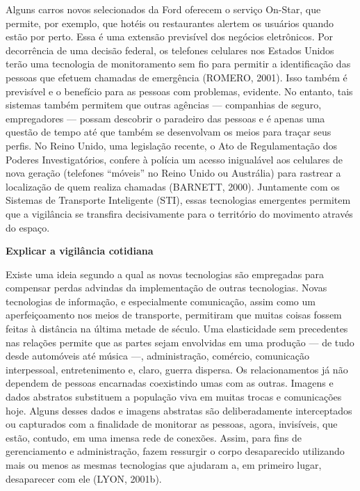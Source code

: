 Alguns carros novos selecionados da Ford oferecem o serviço On-Star, que
permite, por exemplo, que hotéis ou restaurantes alertem os usuários
quando estão por perto. Essa é uma extensão previsível dos negócios
eletrônicos. Por decorrência de uma decisão federal, os telefones
celulares nos Estados Unidos terão uma tecnologia de monitoramento sem
fio para permitir a identificação das pessoas que efetuem chamadas de
emergência (ROMERO, 2001). Isso também é previsível e o benefício para
as pessoas com problemas, evidente. No entanto, tais sistemas também
permitem que outras agências --- companhias de seguro, empregadores ---
possam descobrir o paradeiro das pessoas e é apenas uma questão de tempo
até que também se desenvolvam os meios para traçar seus perfis. No Reino
Unido, uma legislação recente, o Ato de Regulamentação dos Poderes
Investigatórios, confere à polícia um acesso inigualável aos celulares
de nova geração (telefones ``móveis'' no Reino Unido ou Austrália) para
rastrear a localização de quem realiza chamadas (BARNETT, 2000).
Juntamente com os Sistemas de Transporte Inteligente (STI), essas
tecnologias emergentes permitem que a vigilância se transfira
decisivamente para o território do movimento através do espaço.

\textbf{Explicar a vigilância cotidiana}

Existe uma ideia segundo a qual as novas tecnologias são empregadas para
compensar perdas advindas da implementação de outras tecnologias. Novas
tecnologias de informação, e especialmente comunicação, assim como um
aperfeiçoamento nos meios de transporte, permitiram que muitas coisas
fossem feitas à distância na última metade de século. Uma elasticidade
sem precedentes nas relações permite que as partes sejam envolvidas em
uma produção --- de tudo desde automóveis até música ---, administração,
comércio, comunicação interpessoal, entretenimento e, claro, guerra
dispersa. Os relacionamentos já não dependem de pessoas encarnadas
coexistindo umas com as outras. Imagens e dados abstratos substituem a
população viva em muitas trocas e comunicações hoje. Alguns desses dados
e imagens abstratas são deliberadamente interceptados ou capturados com
a finalidade de monitorar as pessoas, agora, invisíveis, que estão,
contudo, em uma imensa rede de conexões. Assim, para fins de
gerenciamento e administração, fazem ressurgir o corpo desaparecido
utilizando mais ou menos as mesmas tecnologias que ajudaram a, em
primeiro lugar, desaparecer com ele (LYON, 2001b).

